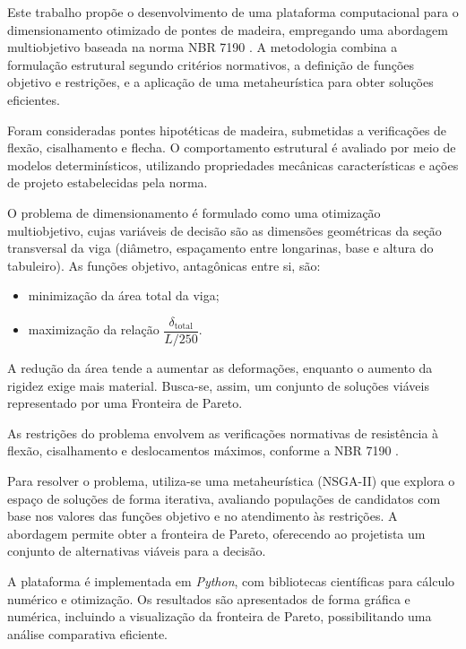 Este trabalho propõe o desenvolvimento de uma plataforma computacional para o dimensionamento otimizado de pontes de madeira, empregando uma abordagem multiobjetivo baseada na norma NBR 7190 \cite{NBR7190-1:2022}. A metodologia combina a formulação estrutural segundo critérios normativos, a definição de funções objetivo e restrições, e a aplicação de uma metaheurística para obter soluções eficientes.

Foram consideradas pontes hipotéticas de madeira, submetidas a verificações de flexão, cisalhamento e flecha. O comportamento estrutural é avaliado por meio de modelos determinísticos, utilizando propriedades mecânicas características e ações de projeto estabelecidas pela norma.

O problema de dimensionamento é formulado como uma otimização multiobjetivo, cujas variáveis de decisão são as dimensões geométricas da seção transversal da viga (diâmetro, espaçamento entre longarinas, base e altura do tabuleiro). As funções objetivo, antagônicas entre si, são:
\begin{itemize}
    \item minimização da área total da viga;
    \item maximização da relação $\dfrac{\delta_{\text{total}}}{L/250}$.
\end{itemize}
A redução da área tende a aumentar as deformações, enquanto o aumento da rigidez exige mais material. Busca-se, assim, um conjunto de soluções viáveis representado por uma Fronteira de Pareto.

As restrições do problema envolvem as verificações normativas de resistência à flexão, cisalhamento e deslocamentos máximos, conforme a NBR 7190 \cite{NBR7190-1:2022}.

Para resolver o problema, utiliza-se uma metaheurística (NSGA-II) que explora o espaço de soluções de forma iterativa, avaliando populações de candidatos com base nos valores das funções objetivo e no atendimento às restrições. A abordagem permite obter a fronteira de Pareto, oferecendo ao projetista um conjunto de alternativas viáveis para a decisão.

A plataforma é implementada em \textit{Python}, com bibliotecas científicas para cálculo numérico e otimização. Os resultados são apresentados de forma gráfica e numérica, incluindo a visualização da fronteira de Pareto, possibilitando uma análise comparativa eficiente.

